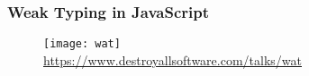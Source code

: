 \begin{frame}
    \frametitle{Weak Typing in JavaScript}
    \begin{figure}
        \centering
        \texttt{[image: wat]}
        \\
        \url{https://www.destroyallsoftware.com/talks/wat}
    \end{figure}
\end{frame}
